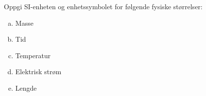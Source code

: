 %
Oppgi SI-enheten og enhetssymbolet for følgende fysiske størrelser:
\begin{enumerate}[a)]
    \item Masse
    \item Tid
    \item Temperatur
    \item Elektrisk strøm
    \item Lengde
\end{enumerate}
